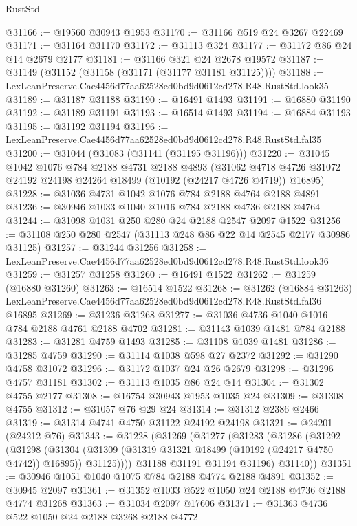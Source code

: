 \begin{lexlean}{RustStd}
\begin{coremodule}
@31166 := @19560 @30943 @1953
@31170 := @31166 @519 @24 @3267 @22469
@31171 := @31164 @31170
@31172 := @31113 @324
@31177 := @31172 @86 @24 @14 @2679 @2177
@31181 := @31166 @321 @24 @2678 @19572
@31187 := @31149 (@31152 (@31158 (@31171 (@31177 @31181 @31125))))
@31188 := LexLeanPreserve.Cae4456d77aa62528ed0bd9d0612cd278.R48.RustStd.look35
@31189 := @31187 @31188
@31190 := @16491 @1493
@31191 := @16880 @31190
@31192 := @31189 @31191
@31193 := @16514 @1493
@31194 := @16884 @31193
@31195 := @31192 @31194
@31196 := LexLeanPreserve.Cae4456d77aa62528ed0bd9d0612cd278.R48.RustStd.fal35
@31200 := @31044 (@31083 (@31141 (@31195 @31196)))
@31220 := @31045
    @1042
    @1076
    @784
    @2188
    @4731
    @2188
    @4893
    (@31062 @4718 @4726 @31072 @24192 @24198 @24264 @18499 (@10192 (@24217 @4726 @4719)) @16895)
@31228 := @31036 @4731 @1042 @1076 @784 @2188 @4764 @2188 @4891
@31236 := @30946 @1033 @1040 @1016 @784 @2188 @4736 @2188 @4764
@31244 := @31098 @1031 @250 @280 @24 @2188 @2547 @2097 @1522
@31256 := @31108 @250 @280 @2547 (@31113 @248 @86 @22 @14 @2545 @2177 @30986 @31125)
@31257 := @31244 @31256
@31258 := LexLeanPreserve.Cae4456d77aa62528ed0bd9d0612cd278.R48.RustStd.look36
@31259 := @31257 @31258
@31260 := @16491 @1522
@31262 := @31259 (@16880 @31260)
@31263 := @16514 @1522
@31268 := @31262
    (@16884 @31263)
    LexLeanPreserve.Cae4456d77aa62528ed0bd9d0612cd278.R48.RustStd.fal36
    @16895
@31269 := @31236 @31268
@31277 := @31036 @4736 @1040 @1016 @784 @2188 @4761 @2188 @4702
@31281 := @31143 @1039 @1481 @784 @2188
@31283 := @31281 @4759 @1493
@31285 := @31108 @1039 @1481
@31286 := @31285 @4759
@31290 := @31114 @1038 @598 @27 @2372
@31292 := @31290 @4758 @31072
@31296 := @31172 @1037 @24 @26 @2679
@31298 := @31296 @4757 @31181
@31302 := @31113 @1035 @86 @24 @14
@31304 := @31302 @4755 @2177
@31308 := @16754 @30943 @1953 @1035 @24
@31309 := @31308 @4755
@31312 := @31057 @76 @29 @24
@31314 := @31312 @2386 @2466
@31319 := @31314 @4741 @4750 @31122 @24192 @24198
@31321 := @24201 (@24212 @76)
@31343 := @31228
    (@31269
      (@31277
        (@31283
          (@31286
            (@31292
              (@31298
                (@31304
                  (@31309 (@31319 @31321 @18499 (@10192 (@24217 @4750 @4742)) @16895))
                  @31125))))
          @31188
          @31191
          @31194
          @31196)
        @31140))
@31351 := @30946 @1051 @1040 @1075 @784 @2188 @4774 @2188 @4891
@31352 := @30945 @2097
@31361 := @31352 @1033 @522 @1050 @24 @2188 @4736 @2188 @4774 @31268
@31363 := @31034 @2097 @17606
@31371 := @31363 @4736 @522 @1050 @24 @2188 @3268 @2188 @4772

\end{coremodule}
\end{lexlean}
